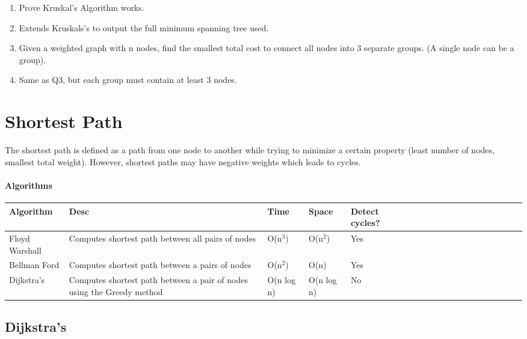 \documentclass[11pt,oneside]{book}
\begin{document}
\begin{enumerate}
\item Prove Kruskal's Algorithm works.
\item Extends Kruskals's to output the full minimum spanning tree used.
\item Given a weighted graph with n nodes, find the smallest total cost to connect all nodes into 3 separate groups. (A single node can be a group).
\item Same as Q3, but each group must contain at least 3 nodes.
\end{enumerate}

    \chapter{ Shortest Path }
        

The shortest path is defined as a path from one node to another while trying to minimize a certain property (least number of nodes, smallest total weight). However, shortest paths may have negative weights which leads to cycles.

\subsubsection{Algorithms}

\vspace{10px}\begin{tabulary}{0.4\linewidth}{|l|l|l|l|l|l|l|l|l|l|l|l|l|l|l|l|l|l|l}\hline


  Algorithm &
  Desc &
  Time &
  Space &
  Detect cycles?\\
\hline


  Floyd Warshall &
  Computes shortest path between all pairs of nodes &
  O(n$^{3}$) &
  O(n$^{2}$) &
  Yes\\

  Bellman Ford &
  Computes shortest path between a pairs of nodes &
  O(n$^{2}$) &
  O(n) &
  Yes\\

  Dijkstra's &
  Computes shortest path between a pair of nodes using the Greedy method &
  O(n log n) &
  O(n log n) &
  No\\

\hline\end{tabulary}


        \section{ Dijkstra's }
        
\end{document}
